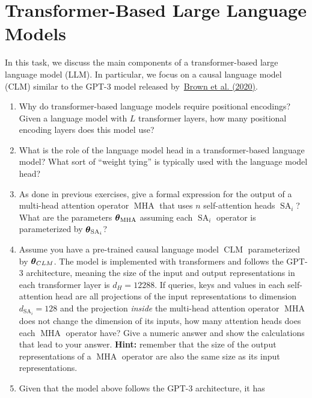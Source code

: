 \documentclass[11pt,a4paper]{article}
\newcommand\op[1]{\operatorname{#1}}
\begin{document}
\section{Transformer-Based Large Language Models}

In this task, we discuss the main components of a transformer-based large
language model (LLM).
In particular, we focus on a causal language model (CLM) similar to the GPT-3
model released by~\href{https://arxiv.org/pdf/2005.14165}{Brown et al. (2020)}.

\begin{enumerate}[label=(\alph*)]
    \item Why do transformer-based language models require positional encodings?
          Given a language model with $L$ transformer layers, how many
          positional encoding layers does this model use?
    \item What is the role of the language model head in a transformer-based
          language model?
          What sort of ``weight tying'' is typically used with the language
          model head?
    \item As done in previous exercises, give a formal expression for the
          output of a multi-head attention operator $\op{MHA}$ that uses $n$
          self-attention heads $\op{SA}_i$?
          What are the parameters $\vtheta_{\op{MHA}}$ assuming each $\op{SA}_i$
          operator is parameterized by $\vtheta_{\op{SA}_i}$?
    \item Assume you have a pre-trained causal language model $\op{CLM}$
          parameterized by ${\boldsymbol{\theta}}_{CLM}$.
          The model is implemented with transformers and follows the GPT-3
          architecture, meaning the size of the input and output representations
          in each transformer layer is $d_H = 12288$.
          If queries, keys and values in each self-attention head are all
          projections of the input representations to dimension
          $d_{\op{SA}_i} = 128$ and the projection \emph{inside} the multi-head
          attention operator $\op{MHA}$ does not change the dimension of its
          inputs, how many attention heads does each $\op{MHA}$ operator have?
          Give a numeric answer and show the calculations that lead to your
          answer.
          \textbf{Hint:} remember that the size of the output representations of
          a $\op{MHA}$ operator are also the same size as its input
          representations.
    \item Given that the model above follows the GPT-3 architecture, it has

\end{enumerate}
\end{document}
